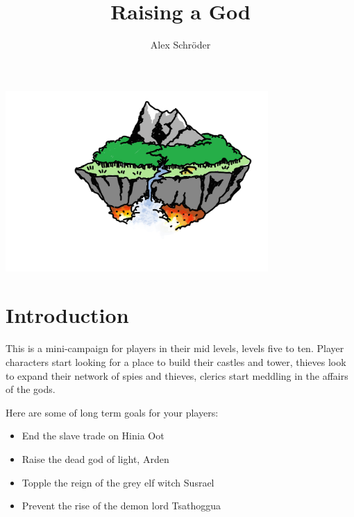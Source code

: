 \documentclass[11pt]{bxart}
\title{\textbf{Raising a God}}
\author{Alex Schröder}
\begin{document}
\begin{titlepage}
  \maketitle
  \centering
  \includegraphics[width=10cm]{Floating-Island.jpg}
  \tableofcontents
\end{titlepage} 


\section{Introduction}

This is a mini-campaign for players in their mid levels, levels five
to ten. Player characters start looking for a place to build their
castles and tower, thieves look to expand their network of spies and
thieves, clerics start meddling in the affairs of the gods.

Here are some of long term goals for your players:

\begin{itemize}
\item End the slave trade on Hinia Oot
\item Raise the dead god of light, Arden
\item Topple the reign of the grey elf witch Susrael
\item Prevent the rise of the demon lord Tsathoggua
\end{itemize}
\end{document}
